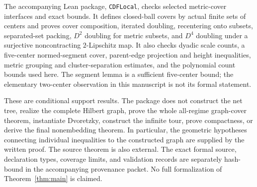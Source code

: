 The accompanying Lean package, \texttt{CDFLocal}, checks selected metric-cover interfaces and exact bounds. It defines closed-ball covers by actual finite sets of centers and proves cover composition, iterated doubling, recentering onto subsets, separated-set packing, $D^2$ doubling for metric subsets, and $D^4$ doubling under a surjective noncontracting $2$-Lipschitz map. It also checks dyadic scale counts, a five-center normed-segment cover, parent-edge projection and height inequalities, metric grouping and cluster-separation estimates, and the polynomial count bounds used here. The segment lemma is a sufficient five-center bound; the elementary two-center observation in this manuscript is not its formal statement.

These are conditional support results. The package does not construct the net tree, realize the complete Hilbert graph, prove the whole all-regime graph-cover theorem, instantiate Dvoretzky, construct the infinite tour, prove compactness, or derive the final nonembedding theorem. In particular, the geometric hypotheses connecting individual inequalities to the constructed graph are supplied by the written proof. The source theorem is also external. The exact formal source, declaration types, coverage limits, and validation records are separately hash-bound in the accompanying provenance packet. No full formalization of Theorem~\ref{thm:main} is claimed.

